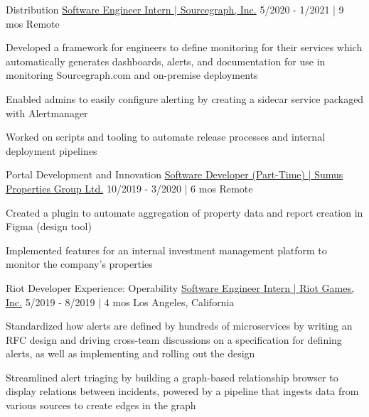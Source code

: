 \begin{cventries}
  \cventry
    {Distribution}
    {\href{https://bobheadxi.dev/experience/sourcegraph-intern}{Software Engineer Intern | Sourcegraph, Inc.}} %
    {5/2020 - 1/2021 | 9 mos} %
    {Remote} %
    {
      \begin{cvitems} %
        \item {Developed a framework for engineers to define monitoring for their services which automatically generates dashboards, alerts, and documentation for use in monitoring Sourcegraph.com and on-premise deployments}
        \item {Enabled admins to easily configure alerting by creating a sidecar service packaged with Alertmanager}
        \item {Worked on scripts and tooling to automate release processes and internal deployment pipelines}
      \end{cvitems}
    }

  \cventry
    {Portal Development and Innovation}
    {\href{https://bobheadxi.dev/experience/sumus}{Software Developer (Part-Time) | Sumus Properties Group Ltd.}} %
    {10/2019 - 3/2020 | 6 mos} %
    {Remote} %
    {
      \begin{cvitems} %
        \item {Created a plugin to automate aggregation of property data and report creation in Figma (design tool)}
        \item {Implemented features for an internal investment management platform to monitor the company's properties}
      \end{cvitems}
    }


  \cventry
    {Riot Developer Experience: Operability}
    {\href{https://bobheadxi.dev/experience/riot-games}{Software Engineer Intern | Riot Games, Inc.}} %
    {5/2019 - 8/2019 | 4 mos} %
    {Los Angeles, California} %
    {
      \begin{cvitems} %
        \item {Standardized how alerts are defined by hundreds of microservices by writing an RFC design and driving cross-team discussions on a specification for defining alerts, as well as implementing and rolling out the design}
        \item {Streamlined alert triaging by building a graph-based relationship browser to display relations between incidents, powered by a pipeline that ingests data from various sources to create edges in the graph}
      \end{cvitems}
    }


\end{cventries}
